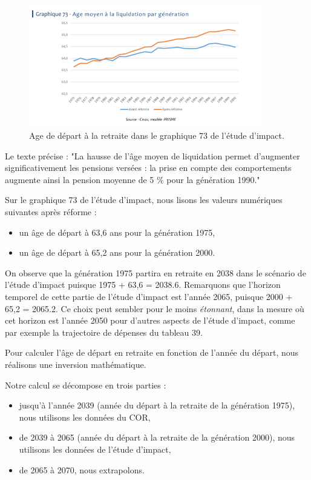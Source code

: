 \documentclass[10pt]{article}
\begin{document}
\begin{figure}
\begin{center}
\includegraphics[width=0.9\textwidth]{../Figures-Etude-Impact/EtudeImpact-Graphique-73-AgeDepartRetraite.png}
\end{center}
\caption{Age de départ à la retraite dans le graphique 73 de l'étude d'impact.}
\label{fig-age-etude-impact-graphique-73}
\end{figure}

Le texte précise : "La hausse de l’âge moyen de liquidation permet d’augmenter 
significativement les pensions versées : la prise en compte des comportements 
augmente ainsi la pension moyenne de 5 \% pour la génération 1990."

Sur le graphique 73 de l'étude d'impact, nous lisons les valeurs numériques 
suivantes après réforme :
\begin{itemize}
\item un âge de départ à 63,6 ans pour la génération 1975,
\item un âge de départ à 65,2 ans pour la génération 2000.
\end{itemize}

On observe que la génération 1975 partira en retraite en 2038 dans le scénario de l'étude d'impact puisque 1975 + 63,6 = 2038.6.
Remarquons que l'horizon temporel de cette partie de l'étude d'impact est l'année 2065, puisque 2000 + 65,2 = 2065.2. 
Ce choix peut sembler pour le moins \emph{étonnant}, dans la mesure où cet horizon 
est l'année 2050 pour d'autres aspects de l'étude d'impact, 
comme par exemple la trajectoire de dépenses du tableau 39. 

Pour calculer l'âge de départ en retraite en fonction de l'année du départ, 
nous réalisons une inversion mathématique.  

Notre calcul se décompose en trois parties :
\begin{itemize}
\item jusqu'à l'année 2039 (année du départ à la retraite 
de la génération 1975), nous utilisons les données du COR, 
\item de 2039 à 2065 (année du départ à la retraite de la génération 
2000), nous utilisons les données de l'étude d'impact,
\item de 2065 à 2070, nous extrapolons. 
\end{itemize}
\end{document}

